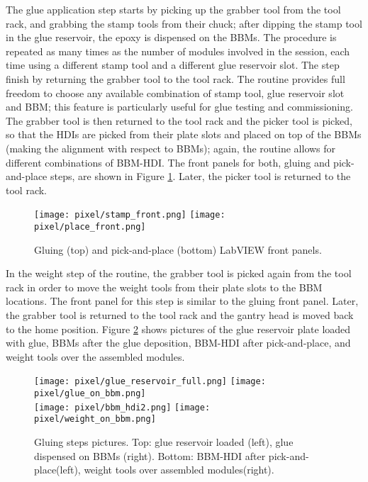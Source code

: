 The glue application step starts by picking up the grabber tool from the tool rack, and grabbing the stamp tools from their chuck; after dipping the stamp tool in the glue reservoir, the epoxy is dispensed on the BBMs. The procedure is repeated as many times as the number of modules involved in the session, each time using a different stamp tool and a different glue reservoir slot. The step finish by returning the grabber tool to the tool rack. The routine provides full freedom to choose any available combination of stamp tool, glue reservoir slot and BBM; this feature is particularly useful for glue testing and commissioning. The grabber tool is then returned to the tool rack and the picker tool is picked, so that the HDIs are picked from their plate slots and placed on top of the BBMs (making the alignment with respect to BBMs); again, the routine allows for different combinations of BBM-HDI. The front panels for both, gluing and pick-and-place steps, are shown in Figure \ref{fig:stamp_place_front}. Later, the picker tool is returned to the tool rack.

\begin{figure}[h]
\begin{center}
  \texttt{[image: pixel/stamp\_front.png]}
  \texttt{[image: pixel/place\_front.png]}
 \caption[Gluing and pick-and-place LabVIEW front panels]{Gluing (top) and pick-and-place (bottom) LabVIEW front panels.}\label{fig:stamp_place_front}
\end{center}
\end{figure}

In the weight step of the routine, the grabber tool is picked again from the tool rack in order to move the weight tools from their plate slots to the BBM locations. The front panel for this step is similar to the gluing front panel. Later, the grabber tool is returned to the tool rack and the gantry head is moved back to the home position. Figure \ref{fig:gluing_steps} shows pictures of the glue reservoir plate loaded with glue, BBMs after the glue deposition, BBM-HDI after pick-and-place, and weight tools over the assembled modules. 

\begin{figure}[h]
\begin{center}
  \texttt{[image: pixel/glue\_reservoir\_full.png]}
  \texttt{[image: pixel/glue\_on\_bbm.png]}\\
  \texttt{[image: pixel/bbm\_hdi2.png]}
  \texttt{[image: pixel/weight\_on\_bbm.png]}
  \caption[Gluing steps pictures.]{Gluing steps pictures. Top: glue reservoir loaded (left), glue dispensed on BBMs (right). Bottom: BBM-HDI after pick-and-place(left), weight tools over assembled modules(right).}\label{fig:gluing_steps}
\end{center}
\end{figure}

